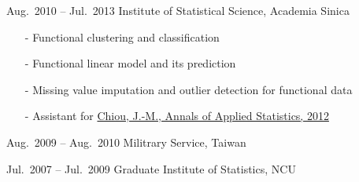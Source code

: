 \documentclass[10pt]{article} %
\begin{document}
\begin{paracol}{2}
  {Aug.~2010 -- Jul.~2013} %
  {Institute of Statistical Science, Academia Sinica} %
  {\vspace{-3ex}
    \begin{itemize}[noitemsep,nolistsep,leftmargin=5mm]
      \item[-] Functional clustering and classification
      \item[-] Functional linear model and its prediction
      \item[-] Missing value imputation and outlier detection for functional data
      \item[-] Assistant for \href{https://projecteuclid.org/euclid.aoas/1356629052/}{Chiou, J.-M., Annals of Applied Statistics, 2012}
    \end{itemize}
  }


  {Aug.~2009 -- Aug.~2010}
  {Militrary Service, Taiwan}
  {}

  {Jul.~2007 -- Jul.~2009} %
  {Graduate Institute of Statistics, NCU} %
  {}



\end{paracol}
\end{document}
